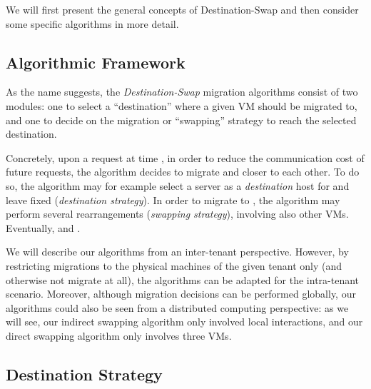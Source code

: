 \documentclass[conference]{IEEEtran}
\newcommand{\cancel}[1]{}
\begin{document}
We will first present the general concepts of Destination-Swap and then consider some specific algorithms in more detail.

\cancel{
The first algorithm we denote as {\sc MeetMiddle} is very simple, Upon a communication request  perform local swaps (migrations) between  and one of it's neighbors on the shortest path to  (select that neighbor randomly with uniform distribution). make the same operation for . These swaps are performed until  and  are neighbors.}

\subsection{Algorithmic Framework}

As the name suggests, the \emph{Destination-Swap} migration algorithms
consist of two modules: one to select a ``destination'' where a given VM should be migrated to,
and one to decide on the migration or ``swapping'' strategy to reach the selected destination.

Concretely, upon a request  at time ,  in order to reduce the communication cost of future requests,
the algorithm decides to migrate  and  closer to each other. To do so, the algorithm may for example select a server  as a \emph{destination} host for  and leave  fixed (\emph{destination strategy}). In order to migrate  to , the algorithm may perform several rearrangements (\emph{swapping strategy}), involving also other VMs. Eventually,  and .

We will describe our algorithms from an inter-tenant perspective. However, by restricting migrations to the physical machines of the given tenant only (and otherwise not migrate at all), the algorithms can be adapted for the intra-tenant scenario. Moreover, although migration decisions can be performed globally, our algorithms
could also be seen from a distributed computing perspective: as we will see, our indirect swapping algorithm only involved local interactions, and our direct
swapping algorithm only involves three VMs.







\subsection{Destination Strategy}
\end{document}
